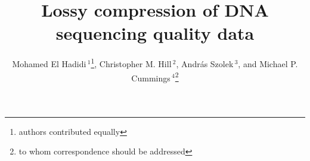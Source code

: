 \documentclass{bioinfo}
\begin{document}

\title[lossy-compression]{Lossy compression of DNA sequencing quality data}
\author[El Hadidi \textit{et~al.}]{Mohamed El Hadidi\,$^{1}$\footnote{authors contributed equally}, Christopher M. Hill\,$^{2}$\footnotemark[1], Andr\'{a}s Szolek\,$^{3}$\footnotemark[1], and Michael P. Cummings\,$^4$\footnote{to whom correspondence should be addressed}}
\address{$^{1}$Department of Algorithms in Bioinformatics,  Center for Bioinformatics, University of T\"{u}bingen, Sand 14, 72076 T\"{u}bingen, Germany \\
$^{2}$Department of Computer Science, University of Maryland, College Park,  Maryland, 20742 USA\\
$^{3}$Department of Applied Bioinformatics, Center for Bioinformatics, Quantitative Biology Center, and Department of Computer Science, University of T\"{u}bingen, Sand 14, 72076 T\"{u}bingen, Germany\\
$^{4}$Center for Bioinformatics and Computational Biology, University of Maryland, College Park, 20742 USA}

\maketitle
\end{document}
